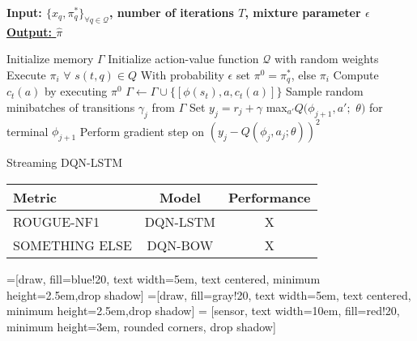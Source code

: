 \documentclass[12pt]{article}
\begin{document}
\begin{algorithm}
    \bf{Input:} { \rm $\{ x_q, \pi^{*}_q \}_{\forall q \in \mathcal{Q} }$, number of iterations $T$, mixture parameter $\epsilon$  } \\
    \underline{\bf{Output:}  $\hat{\pi}$ }
  \begin{algorithmic}[1]
  \STATE \rm Initialize memory $\Gamma$
  \STATE \rm Initialize action-value function $\mathcal{Q}$ with random weights
        \STATE \rm Execute $\pi_i$ $\forall$ $s(t,q) \in Q$
        		\STATE \rm With probability $\epsilon$ set $\pi^0 = \pi^{*}_q$, else $\pi_i$
		\STATE Compute $c_t(a)$ by executing $\pi^0$
		\STATE $\Gamma \leftarrow \Gamma \cup \{ [\phi(s_t), a, c_t(a)]\}$
        \ENDFOR
        \STATE Sample random minibatches of transitions $\gamma_j$ from $\Gamma$
        \STATE Set $y_j = r_j + \gamma$ max$_{a'}Q(\phi_{j+1}, a';$ $\theta)$ for terminal $\phi_{j+1}$
        \STATE Perform gradient step on $(y_j - Q(\phi_j, a_j; \theta))^2$
      \ENDFOR
    \ENDFOR
  \end{algorithmic}
    \caption{Streaming DQN-LSTM}
\end{algorithm}


\begin{tabular}{ l | c | c  }
	\hline
	Metric  & Model  & Performance\\ \hline
  	ROUGUE-NF1 & DQN-LSTM  & X \\
	SOMETHING ELSE & DQN-BOW  & X \\
	\hline
\end{tabular}


    =[draw, fill=blue!20, text width=5em,  text centered, minimum height=2.5em,drop shadow]
    =[draw, fill=gray!20, text width=5em,  text centered, minimum height=2.5em,drop shadow]
     = [sensor, text width=10em, fill=red!20,  minimum height=3em, rounded corners, drop shadow]
    
    \def\blockdist{2.3}
    \def\edgedist{2.5}
\end{document}
